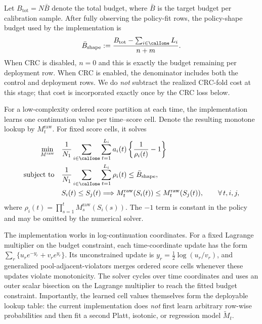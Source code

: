 Let $B_{\mathrm{tot}}=N\bar B$ denote the total budget, where $\bar B$ is the
target budget per calibration sample.  After fully observing the policy-fit
rows, the policy-shape budget used by the implementation is
\begin{equation}
    \bar B_{\mathrm{shape}}
    :=\frac{B_{\mathrm{tot}}-\sum_{i\in\calIone}L_i}{n+m}.
    \label{eq:dapro_lpb_shape_budget}
\end{equation}
When CRC is disabled, $n=0$ and this is exactly the budget remaining per
deployment row.  When CRC is enabled, the denominator includes both the
control and deployment rows.  We do \emph{not} subtract the realized CRC-fold
cost at this stage; that cost is incorporated exactly once by the CRC loss
below.

For a low-complexity ordered score partition at each time, the implementation
learns one continuation value per time--score cell.  Denote the resulting
monotone lookup by $M_t^{\mathrm{raw}}$.  For fixed score cells, it solves
\begin{equation}
\begin{aligned}
    \min_{M^{\mathrm{raw}}}\quad
    &\frac{1}{N_1}\sum_{i\in\calIone}
      \sum_{t=1}^{L_i}a_i(t)
      \left\{\frac{1}{\rho_i(t)}-1\right\}\\
    \text{subject to}\quad
    &\frac{1}{N_1}\sum_{i\in\calIone}
      \sum_{t=1}^{L_i}\rho_i(t)
      \leq\bar B_{\mathrm{shape}},\\
    &S_i(t)\leq S_j(t)
      \Longrightarrow
      M_t^{\mathrm{raw}}(S_i(t))
      \leq M_t^{\mathrm{raw}}(S_j(t)),
      \qquad\forall\,t,i,j,
\end{aligned}
\label{eq:dapro_lpb_soft_optimization}
\end{equation}
where
$\rho_i(t)=\prod_{s=1}^{t}M_s^{\mathrm{raw}}(S_i(s))$.
The $-1$ term is constant in the policy and may be omitted by the numerical
solver.

The implementation works in log-continuation coordinates.  For a fixed
Lagrange multiplier on the budget constraint, each time-coordinate update has
the form $\sum_r\{u_r e^{-y_r}+v_r e^{y_r}\}$.  Its unconstrained update is
$y_r=\frac12\log(u_r/v_r)$, and generalized pool-adjacent-violators merges
ordered score cells whenever these updates violate monotonicity.  The solver
cycles over time coordinates and uses an outer scalar bisection on the
Lagrange multiplier to reach the fitted budget constraint.  Importantly, the
learned cell values themselves form the deployable lookup table: the current
implementation does \emph{not} first learn arbitrary row-wise probabilities
and then fit a second Platt, isotonic, or regression model
$\widetilde M_t$.

